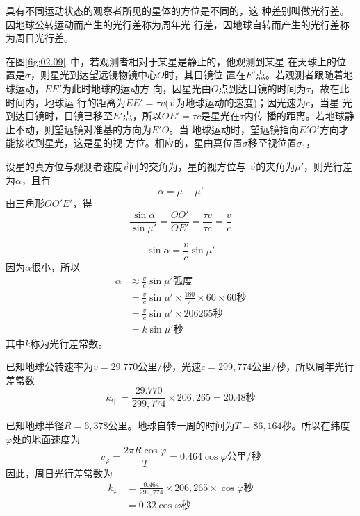 具有不同运动状态的观察者所见的星体的方位是不同的，这
种差别叫做光行差。因地球公转运动而产生的光行差称为周年光
行差，因地球自转而产生的光行差称为周日光行差。

在图\ref{fig:02.09}~中，若观测者相对于某星是静止的，他观测到某星
在天球上的位置是$\sigma$，则星光到达望远镜物镜中心$O$时，其目镜位
置在$E'$点。若观测者跟随着地球运动，$EE'$为此时地球的运动方
向，因星光由$O$点到达目镜的时间为$\tau$，故在此时间内，地球运
行的距离为$EE'=\tau v$($\vec{v}$为地球运动的速度)；因光速为$c$，当星
光到达目镜时，目镜已移至$E'$点，所以$OE'=\tau c$是星光在$\tau$内传
播的距离。若地球静止不动，则望远镜对准基的方向为$E'O$。当
地球运动时，望远镜指向$E'O'$方向才能接收到星光，这是星的视
方位。相应的，星由真位置$\sigma$移至视位置$\sigma_1$，

设星的真方位与观测者速度$\vec{v}$间的交角为，星的视方位与
$\vec{v}$的夹角为$\mu'$，则光行差为$\alpha$，且有
\begin{equation*}
    \alpha=\mu-\mu'
\end{equation*}
由三角形$OO'E'$，得
\begin{equation*}
    \frac{\sin\alpha}{\sin\mu'}=\frac{OO'}{OE'}=\frac{\tau v}{\tau c}=\frac{v}{c}
\end{equation*}

\begin{equation*}
    \sin\alpha=\frac{v}{c}\sin\mu'
\end{equation*}
因为$\alpha$很小，所以
\begin{align*}
    \alpha&\approx\frac{v}{c}\sin\mu'\text{弧度} \\
        &=\frac{v}{c}\sin\mu'\times\frac{180}{\pi}\times 60 \times 60 \text{秒} \\
        &=\frac{v}{c}\sin\mu'\times 206265\text{秒} \\
        &=k\sin\mu'\text{秒}
\end{align*}
其中$k$称为光行差常数。

已知地球公转速率为$v=29.770\text{公里/秒}$，光速$c=299,774
\text{公里/秒}$，所以周年光行差常数
\begin{equation*}
    k_\text{年}=\frac{29.770}{299,774}\times 206,265=20.48\text{秒}
\end{equation*}

已知地球半径$R=6,378\text{公里}$。地球自转一周的时间为$T=
86,164\text{秒}$。所以在纬度$\varphi$处的地面速度为
\begin{equation*}
    v_\varphi=\frac{2\pi R\cos\varphi}{T}=0.464\cos\varphi\text{公里/秒}
\end{equation*}
因此，周日光行差常数为
\begin{align*}
    k_\varphi&=\frac{0.464}{299,774}\times 206,265\times\cos\varphi\text{秒} \\
        &=0.32\cos\varphi\text{秒}
\end{align*}